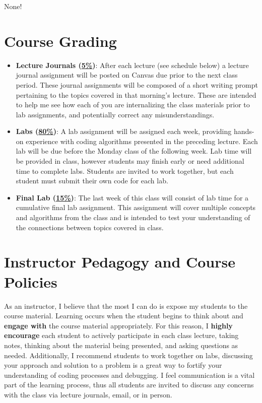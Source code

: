 \documentclass[11pt]{article}
\begin{document}
None!




\section*{Course Grading}
\begin{itemize}
	\item \textbf{Lecture Journals (\underline{5\%})}: After each lecture (see schedule below) a lecture journal assignment will be posted on Canvas due prior to the next class period. These journal assignments will be composed of a short writing prompt pertaining to the topics covered in that morning's lecture. These are intended to help me see how each of you are internalizing the class materials prior to lab assignments, and potentially correct any misunderstandings.
	\item \textbf{Labs (\underline{80\%})}: A lab assignment will be assigned each week, providing hands-on experience with coding algorithms presented in the preceding lecture. Each lab will be due before the Monday class of the following week. Lab time will be provided in class, however students may finish early or need additional time to complete labs. Students are invited to work together, but each student must submit their own code for each lab.
	\item \textbf{Final Lab (\underline{15\%})}: The last week of this class will consist of lab time for a cumulative final lab assignment. This assignment will cover multiple concepts and algorithms from the class and is intended to test your understanding of the connections between topics covered in class.
\end{itemize}


\section*{Instructor Pedagogy and Course Policies}
As an instructor, I believe that the most I can do is expose my students to the course material. Learning occurs when the student begins to think about and \textbf{engage with} the course material appropriately. For this reason, I \textbf{highly encourage} each student to actively participate in each class lecture, taking notes, thinking about the material being presented, and asking questions as needed.  Additionally, I recommend students to work together on labs, discussing your approach and solution to a problem is a great way to fortify your understanding of coding processes and debugging. I feel communication is a vital part of the learning process, thus all students are invited to discuss any concerns with the class via lecture journals, email, or in person. 
\bigskip 
\end{document}
